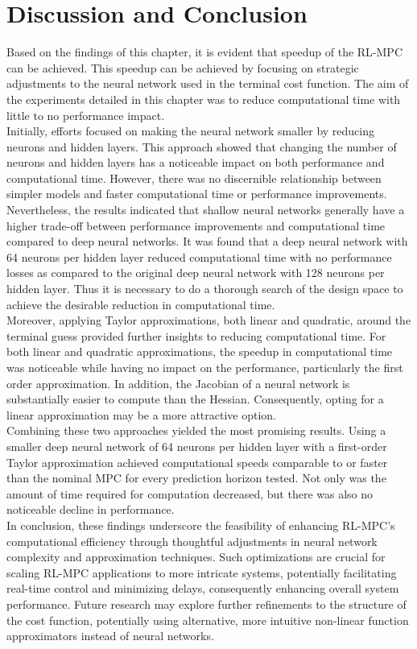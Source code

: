\section{Discussion and Conclusion}

Based on the findings of this chapter, it is evident that speedup of the RL-MPC can be achieved. This speedup can be achieved by focusing on strategic adjustments to the neural network used in the terminal cost function. The aim of the experiments detailed in this chapter was to reduce computational time with little to no performance impact.\\
Initially, efforts focused on making the neural network smaller by reducing neurons and hidden layers. This approach showed that changing the number of neurons and hidden layers has a noticeable impact on both performance and computational time. However, there was no discernible relationship between simpler models and faster computational time or performance improvements. Nevertheless, the results indicated that shallow neural networks generally have a higher trade-off between performance improvements and computational time compared to deep neural networks. It was found that a deep neural network with 64 neurons per hidden layer reduced computational time with no performance losses as compared to the original deep neural network with 128 neurons per hidden layer. Thus it is necessary to do a thorough search of the design space to achieve the desirable reduction in computational time.\\
Moreover, applying Taylor approximations, both linear and quadratic, around the terminal guess provided further insights to reducing computational time. For both linear and quadratic approximations, the speedup in computational time was noticeable while having no impact on the performance, particularly the first order approximation. In addition, the Jacobian of a neural network is substantially easier to compute than the Hessian. Consequently, opting for a linear approximation may be a more attractive option.\\
Combining these two approaches yielded the most promising results. Using a smaller deep neural network of 64 neurons per hidden layer with a first-order Taylor approximation achieved computational speeds comparable to or faster than the nominal MPC for every prediction horizon tested. Not only was the amount of time required for computation decreased, but there was also no noticeable decline in performance.\\
In conclusion, these findings underscore the feasibility of enhancing RL-MPC's computational efficiency through thoughtful adjustments in neural network complexity and approximation techniques. Such optimizations are crucial for scaling RL-MPC applications to more intricate systems, potentially facilitating real-time control and minimizing delays, consequently enhancing overall system performance. Future research may explore further refinements to the structure of the cost function, potentially using alternative, more intuitive non-linear function approximators instead of neural networks.



